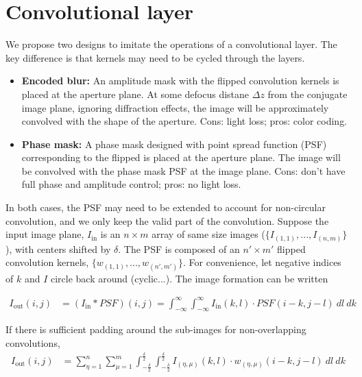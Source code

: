 \documentclass{article}
\begin{document}


\section{Convolutional layer}

We propose two designs to imitate the operations of a convolutional layer. The key difference is that kernels may need to be cycled through the layers. 
\begin{itemize}
\item \textbf{Encoded blur:} An amplitude mask with the flipped convolution kernels is placed at the aperture plane. At some defocus distane $\Delta z$ from the conjugate image plane, ignoring diffraction effects, the image will be approximately convolved with the shape of the aperture. Cons: light loss; pros: color coding.

\item \textbf{Phase mask:} A phase mask designed with point spread function (PSF) corresponding to the flipped is placed at the aperture plane. The image will be convolved with the phase mask PSF at the image plane. Cons: don't have full phase and amplitude control; pros: no light loss.
\end{itemize}

In both cases, the PSF may need to be extended to account for non-circular convolution, and we only keep the valid part of the convolution. Suppose the input image plane, $I_\text{in}$  is an $n \times m$ array of same size images ($\{I_{(1,1)}, ..., I_{(n,m)}\}$), with centers shifted by $\delta$. The PSF is composed of an $n' \times m'$ flipped convolution kernels, $\{w_{(1,1)}, ..., w_{(n',m')}\}$. For convenience, let negative indices of $k$ and $I$ circle back around (cyclic...). The image formation can be written

\begin{align}
I_\text{out}(i, j) &= (I_\text{in} * PSF)(i, j) = \int_{-\infty}^\infty \int_{-\infty}^\infty I_\text{in}(k, l) \cdot PSF(i-k, j-l) \ dl \ dk
\end{align}

If there is sufficient padding around the sub-images for non-overlapping convolutions,
\begin{align}
I_\text{out}(i, j) &= \sum^n_{\eta = 1} \sum^m_{\mu = 1} \int_{-\frac{\delta}{2}}^{\frac{\delta}{2}} \int_{-\frac{\delta}{2}}^{\frac{\delta}{2}} I_{(\eta,\mu)}(k, l) \cdot w_{(\eta, \mu)}(i-k, j-l) \ dl \ dk
\end{align}
\end{document}
